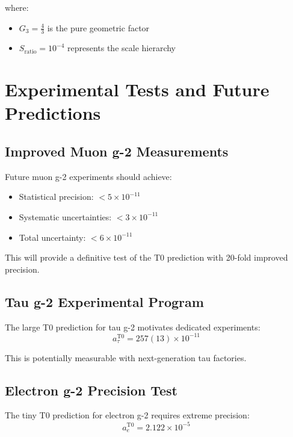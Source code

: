 \documentclass[12pt,a4paper]{report}
\begin{document}
	where:
	\begin{itemize}
		\item $G_3 = \frac{4}{3}$ is the pure geometric factor
		\item $S_{\text{ratio}} = 10^{-4}$ represents the scale hierarchy
	\end{itemize}
	
	\section{Experimental Tests and Future Predictions}
	\label{sec:experimental_tests}
	
	\subsection{Improved Muon g-2 Measurements}
	\label{subsec:improved_muon_measurements}
	
	Future muon g-2 experiments should achieve:
	\begin{itemize}
		\item Statistical precision: $< 5 \times 10^{-11}$
		\item Systematic uncertainties: $< 3 \times 10^{-11}$
		\item Total uncertainty: $< 6 \times 10^{-11}$
	\end{itemize}
	
	This will provide a definitive test of the T0 prediction with 20-fold improved precision.
	
	\subsection{Tau g-2 Experimental Program}
	\label{subsec:tau_g2_program}
	
	The large T0 prediction for tau g-2 motivates dedicated experiments:
	\begin{equation}
		a_\tau^{\text{T0}} = 257(13) \times 10^{-11}
		\label{eq:tau_prediction}
	\end{equation}
	
	This is potentially measurable with next-generation tau factories.
	
	\subsection{Electron g-2 Precision Test}
	\label{subsec:electron_g2_precision}
	
	The tiny T0 prediction for electron g-2 requires extreme precision:
	\begin{equation}
		a_e^{\text{T0}} = 2.122 \times 10^{-5}
		\label{eq:electron_prediction}
	\end{equation}
	
\end{document}

